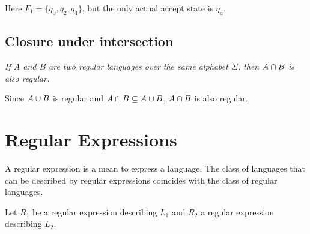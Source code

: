 \documentclass{article}
\newcommand{\emptyString}{\lambda}
\begin{document}
\begin{center}
\end{center}
Here \(F_1=\{q_0, q_2, q_4\}\), but the only actual accept state is \(q_a\).

\subsection{Closure under intersection}

\textit{If \(A\) and \(B\) are two regular languages over the same alphabet
\(\Sigma\), then \(A \cap B\) is also regular.}

Since \(A\cup B\) is regular and \(A \cap B \subseteq A \cup B\),
\(A \cap B\) is also regular.

\section{Regular Expressions}

A regular expression is a mean to express a language.
The class of languages that can be described by
regular expressions coincides with the class of regular languages.

Let \(R_1\) be a regular expression describing \(L_1\) and \(R_2\) a regular expression
describing \(L_2\).
\end{document}
